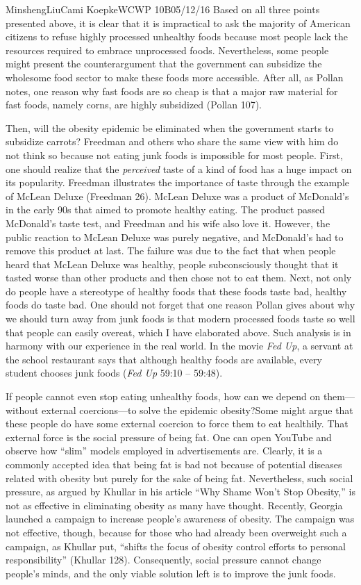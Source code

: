 \documentclass[12pt,letterpaper]{article}
\begin{document}
\begin{mla}{Minsheng}{Liu}{Cami Koepke}{WCWP 10B}{05/12/16}
Based on all three points presented above, it is clear that it is
impractical to ask the majority of American citizens to refuse highly
processed unhealthy foods because most people lack the resources
required to embrace unprocessed foods. Nevertheless, some people might
present the counterargument that the government can subsidize the
wholesome food sector to make these foods more accessible. After all, as
Pollan notes, one reason why fast foods are so cheap is that a major raw
material for fast foods, namely corns, are highly subsidized (Pollan
107).

Then, will the obesity epidemic be eliminated when the government starts
to subsidize carrots? Freedman and others who share the same view with
him do not think so because not eating junk foods is impossible for most
people. First, one should realize that the \emph{perceived} taste of a
kind of food has a huge impact on its popularity. Freedman illustrates
the importance of taste through the example of McLean Deluxe (Freedman
26). McLean Deluxe was a product of McDonald's in the early 90s that
aimed to promote healthy eating. The product passed McDonald's taste
test, and Freedman and his wife also love it. However, the public
reaction to McLean Deluxe was purely negative, and McDonald's had to
remove this product at last. The failure was due to the fact that when
people heard that McLean Deluxe was healthy, people subconsciously
thought that it tasted worse than other products and then chose not to
eat them. Next, not only do people have a stereotype of healthy foods
that these foods taste bad, healthy foods do taste bad. One should not
forget that one reason Pollan gives about why we should turn away from
junk foods is that modern processed foods taste so well that people can
easily overeat, which I have elaborated above. Such analysis is in
harmony with our experience in the real world. In the movie \emph{Fed
Up}, a servant at the school restaurant says that although healthy foods
are available, every student chooses junk foods (\emph{Fed Up} 59:10 --
59:48).

If people cannot even stop eating unhealthy foods, how can we depend on
them---without external coercions---to solve the epidemic obesity?Some
might argue that these people do have some external coercion to force
them to eat healthily. That external force is the social pressure of
being fat. One can open YouTube and observe how ``slim'' models employed
in advertisements are. Clearly, it is a commonly accepted idea that
being fat is bad not because of potential diseases related with obesity
but purely for the sake of being fat. Nevertheless, such social
pressure, as argued by Khullar in his article ``Why Shame Won't Stop
Obesity,'' is not as effective in eliminating obesity as many have
thought. Recently, Georgia launched a campaign to increase people's
awareness of obesity. The campaign was not effective, though, because
for those who had already been overweight such a campaign, as Khullar
put, ``shifts the focus of obesity control efforts to personal
responsibility'' (Khullar 128). Consequently, social pressure cannot
change people's minds, and the only viable solution left is to improve
the junk foods.


\end{mla}
\end{document}
